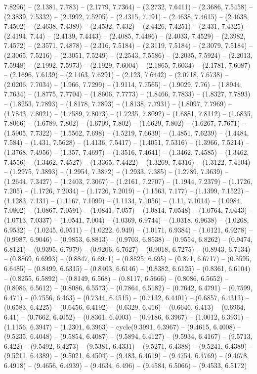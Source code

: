7.8296) -- (2.1381, 7.783) -- (2.1779, 7.7364) -- (2.2732, 7.6411) -- (2.3686, 7.5458) -- (2.3839, 7.5332) -- (2.3992, 7.5205) -- (2.4315, 7.491) -- (2.4638, 7.4615) -- (2.4638, 7.4502) -- (2.4638, 7.4389) -- (2.4532, 7.432) -- (2.4426, 7.4251) -- (2.431, 7.4325) -- (2.4194, 7.44) -- (2.4139, 7.4443) -- (2.4085, 7.4486) -- (2.4033, 7.4529) -- (2.3982, 7.4572) -- (2.3571, 7.4878) -- (2.316, 7.5184) -- (2.3119, 7.5184) -- (2.3079, 7.5184) -- (2.3065, 7.5216) -- (2.3051, 7.5249) -- (2.2543, 7.5586) -- (2.2035, 7.5924) -- (2.2013, 7.5948) -- (2.1992, 7.5973) -- (2.1929, 7.6004) -- (2.1865, 7.6034) -- (2.1781, 7.6087) -- (2.1696, 7.6139) -- (2.1463, 7.6291) -- (2.123, 7.6442) -- (2.0718, 7.6738) -- (2.0206, 7.7034) -- (1.966, 7.7299) -- (1.9114, 7.7565) -- (1.9029, 7.76) -- (1.8944, 7.7634) -- (1.8775, 7.7704) -- (1.8606, 7.7773) -- (1.8466, 7.7833) -- (1.8327, 7.7893) -- (1.8253, 7.7893) -- (1.8178, 7.7893) -- (1.8138, 7.7931) -- (1.8097, 7.7969) -- (1.7843, 7.8021) -- (1.7589, 7.8073) -- (1.7235, 7.8092) -- (1.6881, 7.8112) -- (1.6835, 7.8066) -- (1.6789, 7.802) -- (1.6709, 7.802) -- (1.6629, 7.802) -- (1.6267, 7.7671) -- (1.5905, 7.7322) -- (1.5562, 7.698) -- (1.5219, 7.6639) -- (1.4851, 7.6239) -- (1.4484, 7.584) -- (1.431, 7.5628) -- (1.4136, 7.5417) -- (1.4051, 7.5316) -- (1.3966, 7.5214) -- (1.3768, 7.4956) -- (1.357, 7.4697) -- (1.3516, 7.4641) -- (1.3462, 7.4585) -- (1.3462, 7.4556) -- (1.3462, 7.4527) -- (1.3365, 7.4422) -- (1.3269, 7.4316) -- (1.3122, 7.4104) -- (1.2975, 7.3893) -- (1.2954, 7.3872) -- (1.2933, 7.385) -- (1.2789, 7.3639) -- (1.2644, 7.3427) -- (1.2403, 7.3067) -- (1.2161, 7.2707) -- (1.1944, 7.2379) -- (1.1726, 7.205) -- (1.1726, 7.2034) -- (1.1726, 7.2019) -- (1.1563, 7.177) -- (1.1399, 7.1522) -- (1.1283, 7.131) -- (1.1167, 7.1099) -- (1.1134, 7.1056) -- (1.11, 7.1014) -- (1.0984, 7.0802) -- (1.0867, 7.0591) -- (1.0841, 7.057) -- (1.0814, 7.0548) -- (1.0764, 7.0443) -- (1.0713, 7.0337) -- (1.0541, 7.004) -- (1.0369, 6.9744) -- (1.0318, 6.9638) -- (1.0268, 6.9532) -- (1.0245, 6.9511) -- (1.0222, 6.949) -- (1.0171, 6.9384) -- (1.0121, 6.9278) -- (0.9987, 6.9046) -- (0.9853, 6.8813) -- (0.9703, 6.8538) -- (0.9554, 6.8262) -- (0.9474, 6.8121) -- (0.9395, 6.7979) -- (0.9206, 6.7627) -- (0.9018, 6.7275) -- (0.8943, 6.7134) -- (0.8869, 6.6993) -- (0.8847, 6.6971) -- (0.8825, 6.695) -- (0.871, 6.6717) -- (0.8595, 6.6485) -- (0.8499, 6.6315) -- (0.8403, 6.6146) -- (0.8382, 6.6125) -- (0.8361, 6.6104) -- (0.8255, 6.5892) -- (0.8149, 6.568) -- (0.8117, 6.5666) -- (0.8086, 6.5652) -- (0.8086, 6.5612) -- (0.8086, 6.5573) -- (0.7864, 6.5182) -- (0.7642, 6.4791) -- (0.7599, 6.471) -- (0.7556, 6.463) -- (0.7344, 6.4515) -- (0.7132, 6.4401) -- (0.6857, 6.4313) -- (0.6583, 6.4225) -- (0.6456, 6.4192) -- (0.6329, 6.416) -- (0.6646, 6.413) -- (0.6964, 6.41) -- (0.7662, 6.4052) -- (0.8361, 6.4003) -- (0.9186, 6.3967) -- (1.0012, 6.3931) -- (1.1156, 6.3947) -- (1.2301, 6.3963) -- cycle(9.3991, 6.3967) -- (9.4615, 6.4008) -- (9.5235, 6.4048) -- (9.5854, 6.4087) -- (9.5894, 6.4127) -- (9.5934, 6.4167) -- (9.5713, 6.422) -- (9.5492, 6.4273) -- (9.5381, 6.4331) -- (9.5271, 6.4388) -- (9.5241, 6.4389) -- (9.5211, 6.4389) -- (9.5021, 6.4504) -- (9.483, 6.4619) -- (9.4754, 6.4769) -- (9.4678, 6.4918) -- (9.4656, 6.4939) -- (9.4634, 6.496) -- (9.4584, 6.5066) -- (9.4533, 6.5172) 